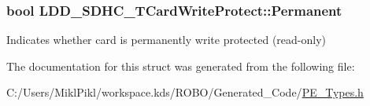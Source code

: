 \subsubsection[{Permanent}]{\setlength{\rightskip}{0pt plus 5cm}bool L\+D\+D\+\_\+\+S\+D\+H\+C\+\_\+\+T\+Card\+Write\+Protect\+::\+Permanent}\label{struct_l_d_d___s_d_h_c___t_card_write_protect_aff6b0178087c770234bd68974d643552}
Indicates whether card is permanently write protected (read-\/only) 

The documentation for this struct was generated from the following file\+:\begin{DoxyCompactItemize}
\item 
C\+:/\+Users/\+Mikl\+Pikl/workspace.\+kds/\+R\+O\+B\+O/\+Generated\+\_\+\+Code/\hyperlink{_p_e___types_8h}{P\+E\+\_\+\+Types.\+h}\end{DoxyCompactItemize}
